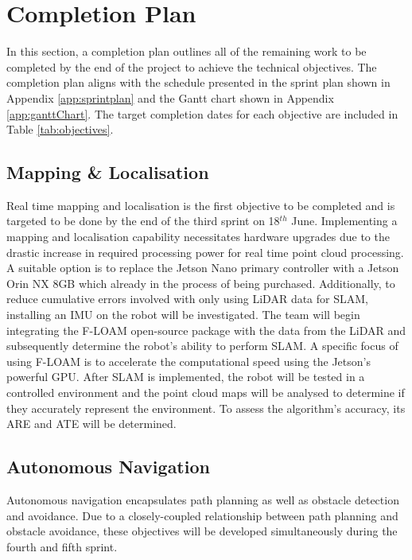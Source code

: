 \section{Completion Plan}
\label{sec:completion-plan}
In this section, a completion plan outlines all of the remaining work to be completed by the end of the project to achieve the technical objectives. The completion plan aligns with the schedule presented in the sprint plan shown in Appendix \ref{app:sprintplan} and the Gantt chart shown in Appendix \ref{app:ganttChart}. The target completion dates for each objective are included in Table \ref{tab:objectives}.

\subsection{Mapping \& Localisation}
Real time mapping and localisation is the first objective to be completed and is targeted to be done by the end of the third sprint on 18$^{th}$ June. Implementing a mapping and localisation capability necessitates hardware upgrades due to the drastic increase in required processing power for real time point cloud processing. A suitable option is to replace the Jetson Nano primary controller with a Jetson Orin NX 8GB which already in the process of being purchased. Additionally, to reduce cumulative errors involved with only using LiDAR data for SLAM, installing an IMU on the robot will be investigated. The team will begin integrating the F-LOAM open-source package with the data from the LiDAR and subsequently determine the robot's ability to perform SLAM. A specific focus of using F-LOAM is to accelerate the computational speed using the Jetson's powerful GPU. After SLAM is implemented, the robot will be tested in a controlled environment and the point cloud maps will be analysed to determine if they accurately represent the environment. To assess the algorithm's accuracy, its ARE and ATE will be determined.

\subsection{Autonomous Navigation}
Autonomous navigation encapsulates path planning as well as obstacle detection and avoidance. Due to a closely-coupled relationship between path planning and obstacle avoidance, these objectives will be developed simultaneously during the fourth and fifth sprint.

